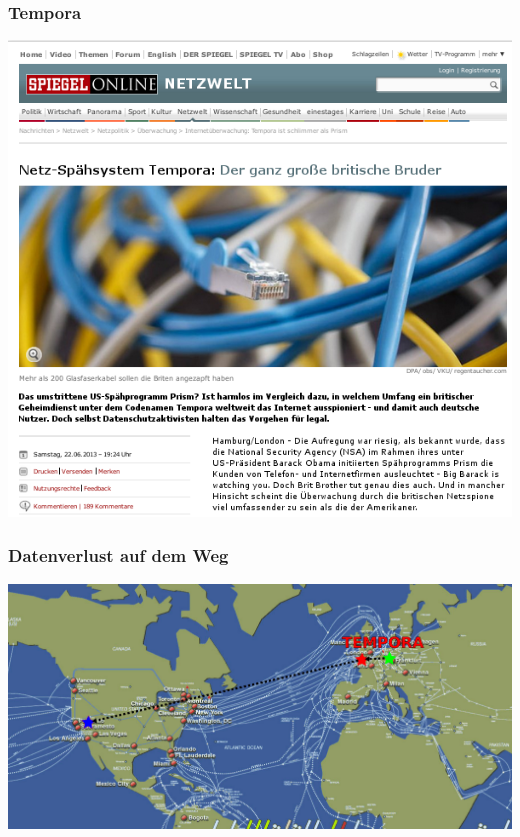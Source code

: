 \documentclass[12pt]{beamer}
\begin{document}
\begin{frame}
    \frametitle{Tempora}
    \includegraphics[height=0.7\textheight]{img/spiegel-tempora.png}
\end{frame}

\begin{frame}
    \frametitle{Datenverlust auf dem Weg}
    \begin{center}
      \includegraphics[height=0.7\textheight]{img/internetmap-abhoeren-tempora}
    \end{center}
\end{frame}
\end{document}
